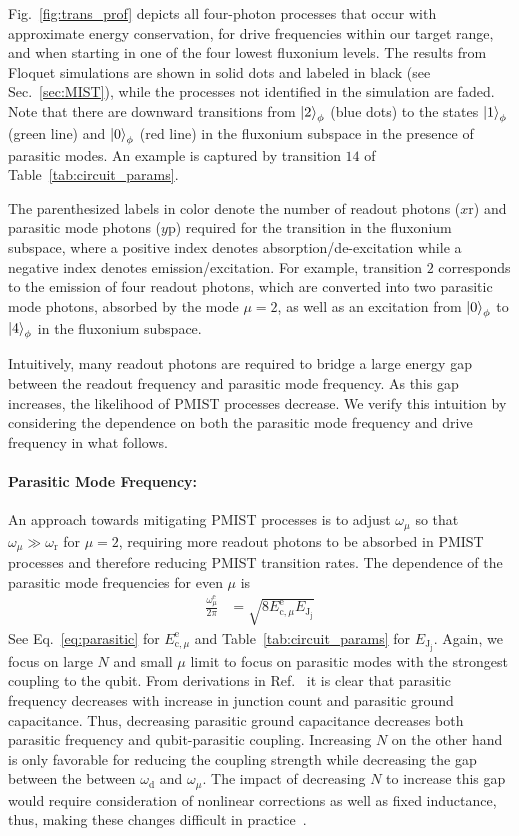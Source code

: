\documentclass[%
reprint,
superscriptaddress,
 amsmath,amssymb,
 aps,
 prx,
longbibliography,
floatfix,
]{revtex4-2}
\begin{document}
Fig.~\ref{fig:trans_prof} depicts all four-photon processes that occur with approximate energy conservation, for drive frequencies within our target range, and when starting in one of the four lowest fluxonium levels. The results from Floquet simulations are  shown in solid dots and labeled in black (see Sec.~\ref{sec:MIST}), while the processes not identified in the simulation are faded. Note that there are downward transitions from $\ket{2}_\phi$ (blue dots) to the states $\ket{1}_\phi$ (green line) and $\ket{0}_\phi$ (red line) in the fluxonium subspace in the presence of parasitic modes. An example is captured by transition $14$ of Table~\ref{tab:circuit_params}. 

The parenthesized labels in color denote the number of readout photons ($x \mathrm{r}$) and parasitic mode photons ($y\mathrm{p}$) required for the transition in the fluxonium subspace, where a positive index denotes absorption/de-excitation while a negative index denotes emission/excitation. For example, transition $2$ corresponds to the emission of four readout photons, which are converted into two parasitic mode photons, absorbed by the mode $\mu=2$, as well as an excitation from $\ket{0}_\phi$ to $\ket{4}_\phi$ in the fluxonium subspace. 

Intuitively, many readout photons are required to bridge a large energy gap between the readout frequency and parasitic mode frequency. As this gap increases, the likelihood of PMIST processes decrease. We verify this intuition
by considering the dependence on both the parasitic mode frequency and drive frequency in what follows.  


\paragraph{Parasitic Mode Frequency:}
An approach towards mitigating PMIST processes is to adjust $\omega_\mu$ so that $\omega_\mu \gg\omega_\textrm{r}$ for $\mu=2$, requiring more readout photons to be absorbed in PMIST processes and therefore reducing PMIST transition rates. The dependence of the parasitic mode frequencies for even $\mu$ is
\begin{align}
    \frac{\omega_\mu^\textrm{e}}{2\pi}&=\sqrt{8E_{\textrm{c},\mu}^\textrm{e} E_{\textrm{J}_\textrm{j}}}
\end{align}
 See Eq.~\ref{eq:parasitic} for $E_{\textrm{c},\mu}^\textrm{e}$ and Table~\ref{tab:circuit_params} for $E_{\textrm{J}_\textrm{j}}$. Again, we focus on large $N$ and small $\mu$ limit to focus on parasitic modes with the strongest coupling to the qubit. From derivations in Ref.~\cite{viola2015collective} it is clear that parasitic frequency decreases with increase in junction count and 
 parasitic ground capacitance. Thus, decreasing parasitic ground capacitance decreases both parasitic frequency and qubit-parasitic coupling. Increasing $N$ on the other hand is only favorable for reducing the coupling strength while decreasing the gap between the between $\omega_\textrm{d}$ and $\omega_\mu$. The impact of decreasing $N$ to increase this gap would require consideration of nonlinear corrections as well as fixed inductance, thus, making these changes difficult in practice~\cite{viola2015collective}. 
\end{document}
